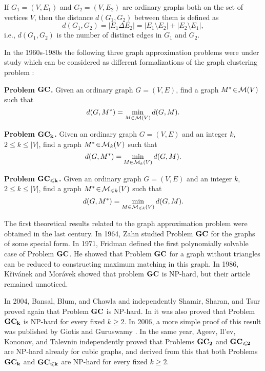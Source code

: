 \documentclass[runningheads]{llncs}
\begin{document}
If $G_1 = (V, E_1)$ and $G_2 = (V, E_2)$ are ordinary graphs both
on the set of vertices $V$, then the distance $d(G_1,G_2)$ between
them is defined as
$$
   d(G_1,G_2)=|E_1 \Delta E_2|=|E_1 \setminus E_2|+|E_2 \setminus E_1|,
$$
i.e., $ d(G_1,G_2)$ is the number of distinct edges in $G_1$ and $G_2$. 

In the 1960s-1980s the following three graph approximation
problems were under study which can be considered as different
formalizations of the graph clustering problem 
\cite{f71,f76,if82,t74,z64}:

{\bf Problem $\bf GC$.} Given an ordinary graph  $G \! = \! (V, E)$, find
a graph ${M^* \! \in \! {\cal M}(V)}$ such that
$$
   d(G,M^*)=\min\limits_{M \in {\cal M}(V)} d(G,M).
$$

{\bf Problem $\bf GC_k$.} Given an ordinary graph  $G \! = \! (V, E)$ and
an integer $k$, ${2 \leqslant k \leqslant |V|}$, find a graph
${M^* \! \in \! {\cal M}_k(V)}$ such that
$$
   d(G,M^*)=\min\limits_{M \in {\cal M}_k(V)} d(G,M).
$$

{\bf Problem $\bf GC_{\leqslant k}$.} Given an ordinary graph  $G \! = \! (V, E)$ 
and an integer $k$, ${2 \leqslant k \leqslant |V|}$, find a graph 
${M^* \! \in \! {\cal M}_{\leqslant k}(V)}$ such that
$$
   d(G,M^*)=\min\limits_{M \in {\cal M}_{\leqslant k}(V)} d(G,M).
$$

The first theoretical results related to the graph
approximation problem were obtained in the 
last century.
In 1964, Zahn \cite{z64} 
studied Problem $\bf GC$ for the graphs of some
special form. 
In 1971, Fridman \cite{f71}
defined the first polynomially
solvable case of Problem $\bf GC$. He showed that Problem
$\bf GC$ for a graph without triangles can be reduced to constructing 
maximum matching in this graph. 
In 1986, K\v{r}iv\'{a}nek and Mor\'{a}vek \cite{km86}
showed that problem $\bf GC$ is NP-hard, but their article remained unnoticed.

In 2004, Bansal, Blum, and Chawla \cite{bbc04}
and independently Shamir, Sharan, and Tsur \cite{sst04}
proved again that Problem $\bf GC$ is NP-hard. 
In \cite{sst04} it was also proved that
Problem ${\bf GC_k}$ is NP-hard for every fixed $k \geqslant 2$.
In 2006, a more simple proof of this result was published 
by Giotis and Guruswamy \cite{gg06}.
In the same year, Ageev, Il'ev, Kononov, and Talevnin \cite{aikt06} 
independently proved that Problems ${\bf GC_2}$ and ${\bf GC_{\leqslant 2}}$ 
are NP-hard already for cubic graphs, 
and derived from this that both Problems $\bf GC_k$ and $\bf GC_{\leqslant k}$
are NP-hard for every fixed $k \geqslant 2$.
\end{document}

